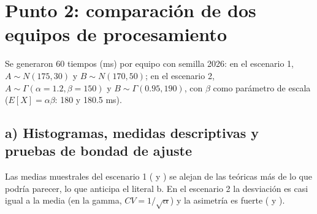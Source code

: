 \documentclass[11pt]{article}
\begin{document}
\section{Punto 2: comparación de dos equipos de procesamiento}\label{sec:p2}
Se generaron 60 tiempos (ms) por equipo con semilla 2026: en el escenario 1, $A\sim N(175,30)$ y
$B\sim N(170,50)$; en el escenario 2, $A\sim\Gamma(\alpha=1.2,\beta=150)$ y $B\sim\Gamma(0.95,190)$, con $\beta$ como
parámetro de escala ($E[X]=\alpha\beta$: 180 y 180.5 ms).

\subsection*{a) Histogramas, medidas descriptivas y pruebas de bondad de ajuste}
Las medias muestrales del escenario 1 (\mediaA{} y \mediaB) se alejan de las teóricas más de lo que podría
parecer, lo que anticipa el literal b. En el escenario 2 la desviación es casi igual a la media (en la gamma,
$CV=1/\sqrt\alpha$) y la asimetría es fuerte (\asimC{} y \asimD).
\end{document}
